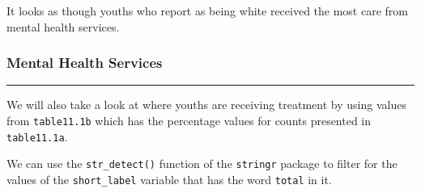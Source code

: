 \documentclass[
]{article}
\begin{document}
It looks as though youths who report as being white received the most
care from mental health services.

\hypertarget{mental-health-services}{%
\subsubsection{\texorpdfstring{\textbf{Mental Health
Services}}{Mental Health Services}}\label{mental-health-services}}

\begin{center}\rule{0.5\linewidth}{0.5pt}\end{center}

We will also take a look at where youths are receiving treatment by
using values from \texttt{table11.1b} which has the percentage values
for counts presented in \texttt{table11.1a}.

We can use the \texttt{str\_detect()} function of the \texttt{stringr}
package to filter for the values of the \texttt{short\_label} variable
that has the word \texttt{total} in it.
\end{document}
